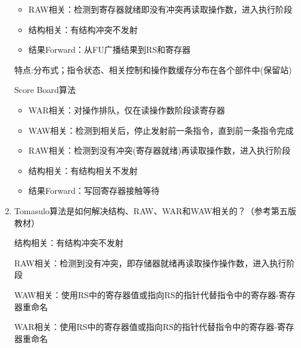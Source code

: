 \documentclass{ctexart}
\begin{document}
\begin{enumerate}
\begin{itemize}
        \item RAW相关：检测到寄存器就绪即没有冲突再读取操作数，进入执行阶段
        \item 结构相关：有结构冲突不发射
        \item 结果Forward：从FU广播结果到RS和寄存器
    \end{itemize}
    \par \quad 特点:分布式；指令状态、相关控制和操作数缓存分布在各个部件中(保留站)
    \par Score Board算法
    \begin{itemize}
        \item WAR相关：对操作排队，仅在读操作数阶段读寄存器
        \item WAW相关：检测到相关后，停止发射前一条指令，直到前一条指令完成
        \item RAW相关：检测到没有冲突(寄存器就绪)再读取操作数，进入执行阶段
        \item 结构相关：有结构相关不发射
        \item 结果Forward：写回寄存器接触等待
    \end{itemize}

    \item Tomasulo算法是如何解决结构、RAW、WAR和WAW相关的？（参考第五版教材）
    \par 结构相关：有结构冲突不发射
    \par RAW相关：检测到没有冲突，即存储器就绪再读取操作操作数，进入执行阶段
    \par WAW相关：使用RS中的寄存器值或指向RS的指针代替指令中的寄存器-寄存器重命名
    \par WAR相关：使用RS中的寄存器值或指向RS的指针代替指令中的寄存器-寄存器重命名
\end{enumerate}
\end{document}
